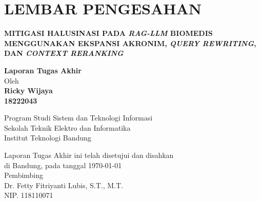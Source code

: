 \chapter*{LEMBAR PENGESAHAN}


\begin{center}
    \vspace{1cm}
  {\large\bfseries MITIGASI HALUSINASI PADA \textit{RAG-LLM} BIOMEDIS MENGGUNAKAN EKSPANSI AKRONIM, \textit{QUERY REWRITING}, DAN \textit{CONTEXT RERANKING}}\\
     \vspace{2cm}

  {\Large \textbf{Laporan Tugas Akhir}}\\

    
    
  {\large Oleh}\\[0.3cm]
    \textbf{
    {\large Ricky Wijaya}\\
    {\large 18222043}
  }\\
    
  \vspace{0.5cm}
 
  {\large Program Studi Sistem dan Teknologi Informasi}\\
  {\large Sekolah Teknik Elektro dan Informatika}\\
  {\large Institut Teknologi Bandung}\\

  \vspace{1.5cm}

  Laporan Tugas Akhir ini telah disetujui dan disahkan\\ 
  di Bandung, pada tanggal \today\\[1cm]

	Pembimbing  \\[3cm]
	Dr. Fetty Fitriyanti Lubis, S.T., M.T.   \\[0.2cm]
	NIP. 118110071 

\end{center}

\vspace{1cm}
\noindent



